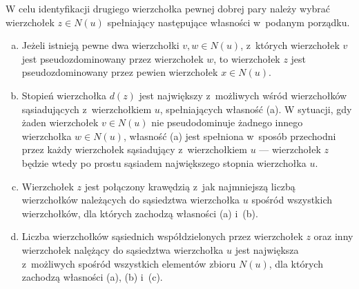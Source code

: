 {\begin{definition}
    W celu identyfikacji drugiego wierzchołka pewnej dobrej pary należy wybrać wierzchołek $z \in N(u)$ spełniający następujące własności w~podanym porządku.
    \begin{enumerate}[(a)]
      \item Jeżeli istnieją pewne dwa wierzchołki $v,w \in N(u)$, z~których wierzchołek $v$ jest pseudozdominowany przez wierzchołek $w$, to wierzchołek $z$ jest pseudozdominowany przez pewien wierzchołek $x \in N(u)$.
      \item Stopień wierzchołka $d(z)$ jest największy z~możliwych wśród wierzchołków sąsiadujących z~wierzchołkiem $u$, spełniających własność (a).
      W sytuacji, gdy żaden wierzchołek $v \in N(u)$ nie pseudodominuje żadnego innego wierzchołka $w \in N(u)$, własność (a) jest spełniona w~sposób przechodni przez każdy wierzchołek sąsiadujący z~wierzchołkiem $u$ --- wierzchołek $z$ będzie wtedy po prostu sąsiadem największego stopnia wierzchołka $u$.
      \item Wierzchołek $z$ jest połączony krawędzią z~jak najmniejszą liczbą wierzchołków należących do sąsiedztwa wierzchołka $u$ spośród wszystkich wierzchołków, dla których zachodzą własności (a) i~(b).
      \item Liczba wierzchołków sąsiednich współdzielonych przez wierzchołek $z$ oraz inny wierzchołek nalężący do sąsiedztwa wierzchołka $u$ jest największa z~możliwych spośród wszystkich elementów zbioru $N(u)$, dla których zachodzą własności (a), (b) i~(c).
    \end{enumerate}
  \end{definition}
}

